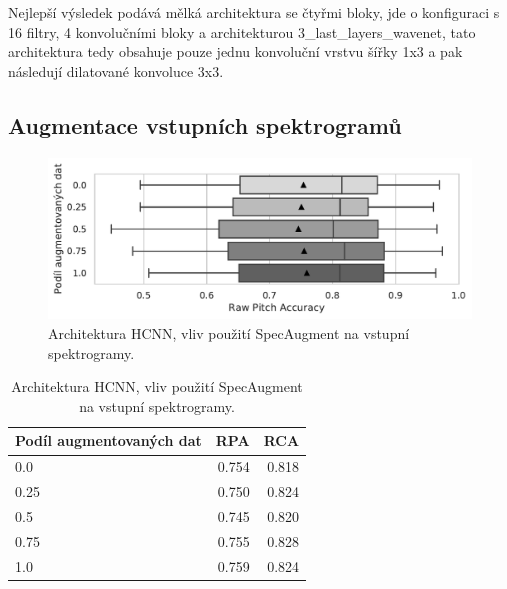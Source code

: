 Nejlepší výsledek podává mělká architektura se čtyřmi bloky, jde o konfiguraci s 16 filtry, 4 konvolučními bloky a architekturou 3\_last\_layers\_wavenet, tato architektura tedy obsahuje pouze jednu konvoluční vrstvu šířky 1x3 a pak následují dilatované konvoluce 3x3.

\subsection{Augmentace vstupních spektrogramů}

\begin{figure}[h]\centering
    \includegraphics[scale=0.6]{../img/figures/spectrogram_specaugment_grey}
\caption{Architektura HCNN, vliv použití SpecAugment na vstupní spektrogramy.}\label{obr:hcnn_specaugment}
\end{figure}

\begin{table}[h]
\centering
    \begin{tabular}{lrr}
    \toprule
    Podíl augmentovaných dat &   RPA &   RCA \\
    \midrule
                        0.0 & 0.754 & 0.818 \\
                        0.25 & 0.750 & 0.824 \\
                        0.5 & 0.745 & 0.820 \\
                        0.75 & 0.755 & 0.828 \\
                        1.0 & 0.759 & 0.824 \\
    \bottomrule
    \end{tabular}
\caption{Architektura HCNN, vliv použití SpecAugment na vstupní spektrogramy.}\label{tab:hcnn_specaugment}
\end{table}

